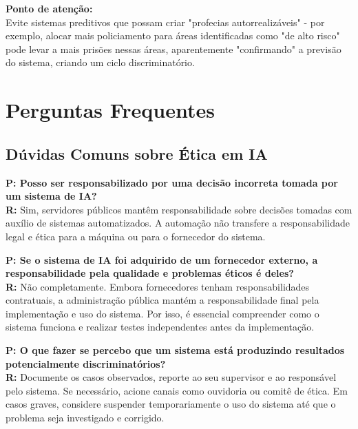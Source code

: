\documentclass[12pt,a4paper]{article}
\begin{document}
\begin{tcolorbox}[warning]
\textbf{Ponto de atenção:} \\
Evite sistemas preditivos que possam criar "profecias autorrealizáveis" - por exemplo, alocar mais policiamento para áreas identificadas como "de alto risco" pode levar a mais prisões nessas áreas, aparentemente "confirmando" a previsão do sistema, criando um ciclo discriminatório.
\end{tcolorbox}

\newpage
\section{Perguntas Frequentes}

\subsection{Dúvidas Comuns sobre Ética em IA}

\begin{tcolorbox}[example]
\textbf{P: Posso ser responsabilizado por uma decisão incorreta tomada por um sistema de IA?} \\
\textbf{R:} Sim, servidores públicos mantêm responsabilidade sobre decisões tomadas com auxílio de sistemas automatizados. A automação não transfere a responsabilidade legal e ética para a máquina ou para o fornecedor do sistema.
\end{tcolorbox}

\begin{tcolorbox}[example]
\textbf{P: Se o sistema de IA foi adquirido de um fornecedor externo, a responsabilidade pela qualidade e problemas éticos é deles?} \\
\textbf{R:} Não completamente. Embora fornecedores tenham responsabilidades contratuais, a administração pública mantém a responsabilidade final pela implementação e uso do sistema. Por isso, é essencial compreender como o sistema funciona e realizar testes independentes antes da implementação.
\end{tcolorbox}

\begin{tcolorbox}[example]
\textbf{P: O que fazer se percebo que um sistema está produzindo resultados potencialmente discriminatórios?} \\
\textbf{R:} Documente os casos observados, reporte ao seu supervisor e ao responsável pelo sistema. Se necessário, acione canais como ouvidoria ou comitê de ética. Em casos graves, considere suspender temporariamente o uso do sistema até que o problema seja investigado e corrigido.
\end{tcolorbox}
\end{document}

